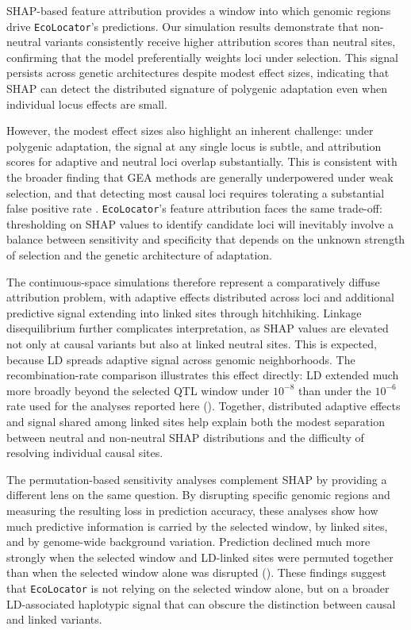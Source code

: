 \documentclass[]{article}
\newcommand{\ecolocator}{\texttt{EcoLocator}\xspace}
\begin{document}
SHAP-based feature attribution provides a window
into which genomic regions drive \ecolocator's predictions.
Our simulation results demonstrate
that non-neutral variants consistently receive
higher attribution scores than neutral sites,
confirming that the model preferentially weights loci
under selection.
This signal persists across genetic architectures
despite modest effect sizes,
indicating that SHAP can detect the distributed signature
of polygenic adaptation
even when individual locus effects are small.

However,
the modest effect sizes also highlight
an inherent challenge:
under polygenic adaptation,
the signal at any single locus is subtle,
and attribution scores for adaptive and neutral loci
overlap substantially.
This is consistent with the broader finding
that GEA methods are generally underpowered
under weak selection,
and that detecting most causal loci
requires tolerating a substantial false positive rate
\citep{lotterhos_whitlock_2015, booker_wza_2024}.
\ecolocator's feature attribution faces the same trade-off:
thresholding on SHAP values to identify candidate loci
will inevitably involve a balance
between sensitivity and specificity
that depends on the unknown strength of selection
and the genetic architecture of adaptation.

The continuous-space simulations therefore represent
a comparatively diffuse attribution problem,
with adaptive effects distributed across loci
and additional predictive signal extending into linked sites
through hitchhiking.
Linkage disequilibrium further complicates interpretation,
as SHAP values are elevated not only at causal variants
but also at linked neutral sites.
This is expected,
because LD spreads adaptive signal
across genomic neighborhoods.
The recombination-rate comparison illustrates this effect directly:
LD extended much more broadly beyond the selected QTL window
under \(10^{-8}\) than under the \(10^{-6}\) rate
used for the analyses reported here
().
Together, distributed adaptive effects and signal shared among linked sites
help explain both the modest separation between neutral
and non-neutral SHAP distributions
and the difficulty of resolving individual causal sites.

The permutation-based sensitivity analyses
complement SHAP by providing a different lens
on the same question.
By disrupting specific genomic regions
and measuring the resulting loss in prediction accuracy,
these analyses show how much predictive information is carried
by the selected window,
by linked sites,
and by genome-wide background variation.
Prediction declined much more strongly
when the selected window and LD-linked sites were permuted together
than when the selected window alone was disrupted
().
These findings suggest that \ecolocator is not relying
on the selected window alone,
but on a broader LD-associated haplotypic signal
that can obscure the distinction between causal and linked variants.
\end{document}
